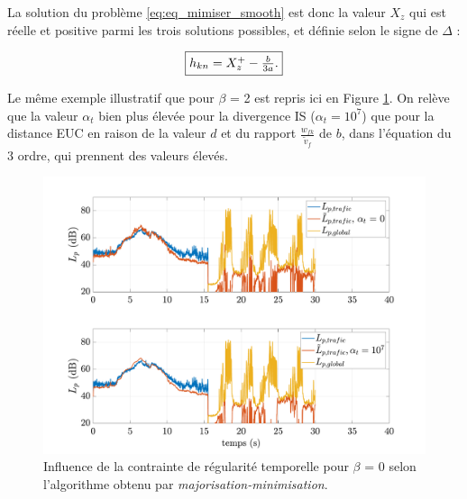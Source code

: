 La solution du problème \ref{eq:eq_mimiser_smooth} est donc la valeur $X_z$ qui est réelle et positive parmi les trois solutions possibles, et définie selon le signe de $\Delta$ : 

\begin{equation}
\fbox{$
h_{kn} = X_{z}^+-\frac{b}{3a}.
$}
\end{equation}

Le même exemple illustratif que pour $\beta$ = 2 est repris ici en Figure \ref{fig:smooth_0}. On relève que la valeur $\alpha_t$ bien plus élevée pour la divergence IS ($\alpha_t = 10^7$) que pour la distance EUC en raison de la valeur $d$ et du rapport $\frac{w_{fk}}{\tilde{v}_f}$ de $b$, dans l'équation du 3\ieme{} ordre, qui prennent des valeurs élevés.

\begin{figure}[h]
\centering
\includegraphics[width=.9\linewidth]{./figures/NMF/LpSmooth_0.pdf}
\caption{Influence de la contrainte de régularité temporelle pour $\beta$ = 0 selon l'algorithme obtenu par \textit{majorisation-minimisation}.}
\label{fig:smooth_0}
\end{figure}
